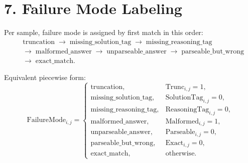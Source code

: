 \documentclass[11pt]{article}
\begin{document}
\section*{7. Failure Mode Labeling}
Per sample, failure mode is assigned by first match in this order:
\[
\begin{aligned}
&\mathrm{truncation}
\;\to\;
\mathrm{missing\_solution\_tag}
\;\to\;
\mathrm{missing\_reasoning\_tag} \\
&\to\;
\mathrm{malformed\_answer}
\;\to\;
\mathrm{unparseable\_answer}
\;\to\;
\mathrm{parseable\_but\_wrong} \\
&\to\;
\mathrm{exact\_match}.
\end{aligned}
\]

Equivalent piecewise form:
\[
\mathrm{FailureMode}_{i,j}
=
\begin{cases}
\mathrm{truncation}, & \mathrm{Trunc}_{i,j}=1, \\
\mathrm{missing\_solution\_tag}, & \mathrm{SolutionTag}_{i,j}=0, \\
\mathrm{missing\_reasoning\_tag}, & \mathrm{ReasoningTag}_{i,j}=0, \\
\mathrm{malformed\_answer}, & \mathrm{Malformed}_{i,j}=1, \\
\mathrm{unparseable\_answer}, & \mathrm{Parseable}_{i,j}=0, \\
\mathrm{parseable\_but\_wrong}, & \mathrm{Exact}_{i,j}=0, \\
\mathrm{exact\_match}, & \text{otherwise.}
\end{cases}
\]
\end{document}
